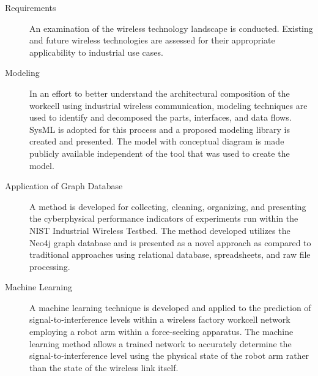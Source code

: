\documentclass[twocolumn]{IEEEtran}
\begin{document}
		\begin{description}
			\item[Requirements] \cite{CandellRW2017} \cite{Montgomery2019} \cite{Candell2018.IWSGuide} An examination of the wireless technology landscape is conducted.  Existing and future wireless technologies are assessed for their appropriate applicability to industrial use cases. 
			
			\item[Modeling] \cite{Candell2019ASR.SYSML} \cite{Candell2018SysML.JRES} \cite{Candell2018SysML.GitHub} In an effort to better understand the architectural composition of the workcell using industrial wireless communication, modeling techniques are used to identify and decomposed the parts, interfaces, and data flows.  SysML is adopted for this process and a proposed modeling library is created and presented.  The model with conceptual diagram is made publicly available independent of the tool that was used to create the model.
			
			\item[Application of Graph Database] \cite{CandellISIT2020.Conf} A method is developed for collecting, cleaning, organizing, and presenting the cyberphysical performance indicators of experiments run within the NIST Industrial Wireless Testbed. The method developed utilizes the Neo4j graph database and is presented as a novel approach as compared to traditional approaches using relational database, spreadsheets, and raw file processing.
			
			\item[Machine Learning] \cite{CandellISIE2019.Conf} \cite{CandellISIE2019.Conf.Data} \cite{CandellIJAMT2020.Jrml} A machine learning technique is developed and applied to the prediction of signal-to-interference levels within a wireless factory workcell network employing a robot arm within a force-seeking apparatus.  The machine learning method allows a trained network to accurately determine the signal-to-interference level using the physical state of the robot arm rather than the state of the wireless link itself.
		\end{description}
	
		
%		
%		
%		
		
\end{document}
